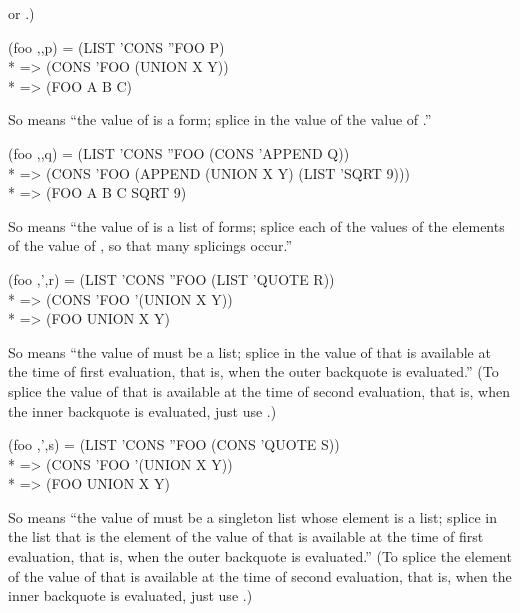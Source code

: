 \begin{new}
or .)
\begin{lisp}
{\Xbq}{\Xbq}(foo ,{\Xatsign},p) = (LIST 'CONS ''FOO P) \\*
 => (CONS 'FOO (UNION X Y)) \\*
 => (FOO A B C)
\end{lisp}
So  means ``the value of  is a form;
splice in the value of the value of .''
\begin{lisp}
{\Xbq}{\Xbq}(foo ,{\Xatsign},{\Xatsign}q) = (LIST 'CONS ''FOO (CONS 'APPEND Q)) \\*
 => (CONS 'FOO (APPEND (UNION X Y) (LIST 'SQRT 9))) \\*
 => (FOO A B C SQRT 9)
\end{lisp}
So  means ``the value of  is a list of forms;
splice each of the values of the elements of the value of ,
so that many splicings occur.''
\begin{lisp}
{\Xbq}{\Xbq}(foo ,{\Xatsign}',r) = (LIST 'CONS ''FOO (LIST 'QUOTE R)) \\*
 => (CONS 'FOO '(UNION X Y)) \\*
 => (FOO UNION X Y)
\end{lisp}
So  means ``the value of  must be a list;
splice in the value of 
that is available at the time of first evaluation,
that is, when the outer backquote is evaluated.''
(To splice the value of  that is available at the time of second evaluation,
that is, when the inner backquote is evaluated,
just use .)
\begin{lisp}
{\Xbq}{\Xbq}(foo ,{\Xatsign}',{\Xatsign}s) = (LIST 'CONS ''FOO (CONS 'QUOTE S)) \\*
 => (CONS 'FOO '(UNION X Y)) \\*
 => (FOO UNION X Y)
\end{lisp}
So  means ``the value of  must be a singleton list whose
element is a list;
splice in the list that is the element of the value of 
that is available at the time of first evaluation,
that is, when the outer backquote is evaluated.''
(To splice the element of the value of  that is available at the time of second evaluation,
that is, when the inner backquote is evaluated,
just use .)


\end{new}
